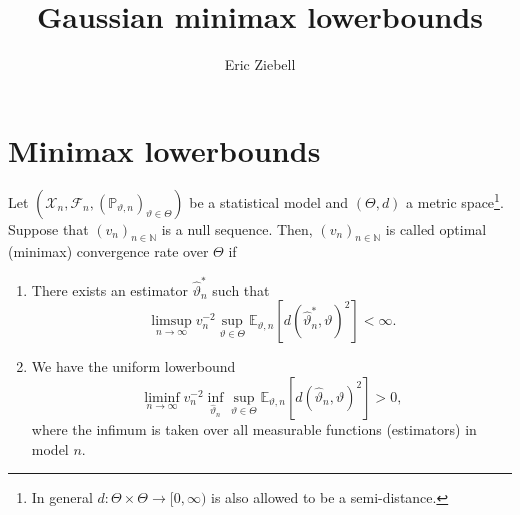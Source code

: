 \documentclass{book}
\author{Eric Ziebell}
\title{Gaussian minimax lowerbounds}
\begin{document}
\maketitle

\chapter{Minimax lowerbounds}
\begin{definition}
Let $(\mathcal{X}_n, \mathcal{F}_n, (\mathbb{P}_{\vartheta,n})_{\vartheta \in \Theta})$ be a statistical model and $(\Theta, d)$ a metric space\footnote{In general $d:\Theta \times \Theta \rightarrow [0,\infty)$ is also allowed to be a semi-distance.}. Suppose that $(v_n)_{n \in \mathbb{N}}$ is a null sequence. Then, $(v_n)_{n \in \mathbb{N}}$ is called optimal (minimax) convergence rate over $\Theta$ if
\begin{enumerate}
    \item There exists an estimator $\hat{\vartheta}_n^{*}$ such that
\begin{equation*}
\limsup_{n \rightarrow \infty} v_n^{-2} \sup_{\vartheta \in \Theta} \mathbb{E}_{\vartheta, n}[d(\hat{\vartheta}_n^{*}, \vartheta)^{2}]< \infty.
\end{equation*}
\item We have the uniform lowerbound
\begin{equation*}
\liminf_{n \rightarrow \infty} v_n^{-2} \inf_{\hat{\vartheta}_n} \sup_{\vartheta \in \Theta} \mathbb{E}_{\vartheta,n}[d(\hat{\vartheta}_{n}, \vartheta)^{2}]>0,
\end{equation*}
where the infimum is taken over all measurable functions (estimators) in model $n$.
\end{enumerate}





\end{definition}




  
\end{document}
